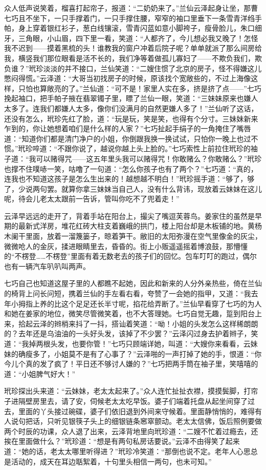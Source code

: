 \par 众人低声说笑着，榴喜打起帘子，报道：“二奶奶来了。”兰仙云泽起身让坐，那曹七巧且不坐下，一只手撑着门，一只手撑住腰，窄窄的袖口里垂下一条雪青洋绉手帕，身上穿着银红衫子，葱白线镶滚，雪青闪蓝如意小脚袴子，瘦骨脸儿，朱口细牙，三角眼，小山眉，四下里一看，笑道：“人都齐了，今儿想必我又晚了！怎怪我不迟到——摸着黑梳的头！谁教我的窗户冲着后院子呢？单单就派了那么间房给我，横竖我们那位眼看是活不长的，我们净等着做孤儿寡妇了——不欺负我们，欺负谁？”玳珍淡淡的并不接口，兰仙笑道：“二嫂住惯了北京的房子，怪不得嫌这儿憋闷得慌。”云泽道：“大哥当初找房子的时候，原该找个宽敞些的，不过上海像这样，只怕也算敞亮的了。”兰仙道：“可不是！家里人实在多，挤是挤了点——”七巧挽起袖口，把手帕子掖在翡翠镯子里，瞟了兰仙一眼，笑道：“三妹妹原来也嫌人太多了。连我们都嫌人太多，像你们没满月的自然更嫌人多了！”兰仙听了这话，还没有怎么，玳珍先红了脸，道：“玩是玩，笑是笑，也得有个分寸。三妹妹新来乍到的，你让她想着咱们是什么样的人家？”七巧扯起手绢子的一角掩住了嘴唇道：“知道你们都是清门净户的小姐，你倒跟我换一换试试，只怕你一晚上也过不惯。”玳珍啐道：“不跟你说了，越说你越上头上脸的。”七巧索性上前拉住玳珍的袖子道：“我可以赌得咒——这五年里头我可以赌得咒！你敢赌么？你敢赌么？”玳珍也撑不住噗哧一笑，咕噜了一句道：“怎么你孩子也有了两个？”七巧道：“真的，连我也不知道这孩子是怎么生出来的！越想越不明白！”玳珍摇手道：“够了，够了，少说两句罢。就算你拿三妹妹当自己人，没有什么背讳，现放着云妹妹在这儿呢，待会儿老太太跟前一告诉，管叫你吃不了兜着走！”
\par 云泽早远远的走开了，背着手站在阳台上，撮尖了嘴逗芙蓉鸟。姜家住的虽然是早期的最新式洋房，堆花红砖大柱支着巍峨的拱门，楼上阳台却是木板铺的地。黄杨木阑干里面，放着一溜篾篓子，晾着笋干。敝旧的太阳弥漫在空气里像金的灰尘，微微呛人的金灰，揉进眼睛里去，昏昏的。街上小贩遥遥摇着博浪鼓，那懵懂的“不楞登……不楞登”里面有着无数老去的孩子们的回忆。包车叮叮的跑过，偶尔也有一辆汽车叭叭叫两声。
\par 七巧自己也知道这屋子里的人都瞧不起她，因此和新来的人分外亲热些，倚在兰仙的椅背上问长问短，携着兰仙的手左看右看，夸赞了一会她的指甲，又道：“我去年小拇指上养的比这个足足还长半寸呢，掐花给弄断了。”兰仙早看穿了七巧的为人和她在姜家的地位，微笑尽管微笑着，也不大答理她。七巧自觉无趣，踅到阳台上来，拾起云泽的辫梢来抖了一抖，搭讪着笑道：“呦！小姐的头发怎么这样稀朗朗的？去年还是乌油油的一头好头发，该掉了不少罢？”云泽闪过身去护着辫子，笑道：“我掉两根头发，也要你管！”七巧只顾端详她，叫道：“大嫂你来看看，云妹妹的确瘦多了，小姐莫不是有了心事了？”云泽啪的一声打掉了她的手，恨道：“你今儿个真的发了疯了！平日还不够讨人嫌的？”七巧把两手筒在袖子里，笑嘻嘻的道：“小姐脾气好大！”
\par 玳珍探出头来道：“云妹妹，老太太起来了。”众人连忙扯扯衣襟，摸摸鬓脚，打帘子进隔壁房里去，请了安，伺候老太太吃早饭。婆子们端着托盘从起坐间穿了过去，里面的丫头接过碗碟，婆子们依旧退到外间来守候着。里面静悄悄的，难得有人说句把话，只听见银筷子头上的细银链条窸窣颤动。老太太信佛，饭后照例要做两个时辰的功课，众人退了出来，云泽背地里向玳珍道：“二嫂不忙着过瘾去，还挨在里面做什么？”玳珍道：“想是有两句私房话要说。”云泽不由得笑了起来道：“她的话，老太太哪里听得进？”玳珍冷笑道：“那倒也说不定。老年人心思总是活动的，成天在耳边聒絮着，十句里头相信一两句，也未可知。”
